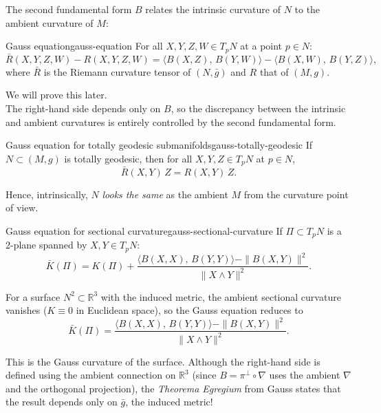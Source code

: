 The second fundamental form $B$ relates the intrinsic curvature of $N$ to the ambient curvature of $M$:

\begin{colortheo}{Gauss equation}{gauss-equation}
For all $X, Y, Z, W \in T_p N$ at a point $p \in N$:
\[
\bar R(X, Y, Z, W) - R(X, Y, Z, W) = \langle B(X, Z),\, B(Y, W)\rangle - \langle B(X, W),\, B(Y, Z)\rangle,
\]
where $\bar R$ is the Riemann curvature tensor of $(N, \bar g)$ and $R$ that of $(M, g)$.
\end{colortheo}

We will prove this later.\\

The right-hand side depends only on $B$, so the discrepancy between the intrinsic and ambient curvatures is entirely controlled by the second fundamental form.

\begin{colorcor}{Gauss equation for totally geodesic submanifolds}{gauss-totally-geodesic}
If $N \subset (M, g)$ is totally geodesic, then for all $X, Y, Z \in T_p N$ at $p \in N$,
\[
\bar R(X, Y)\, Z = R(X, Y)\, Z.
\]
\end{colorcor}

Hence, intrinsically, $N$ \emph{looks the same} as the ambient $M$ from the curvature point of view.

\begin{colorcor}{Gauss equation for sectional curvature}{gauss-sectional-curvature}
If $\Pi \subset T_p N$ is a 2-plane spanned by $X, Y \in T_p N$:
\[
\bar{K}(\Pi) = K(\Pi) + \frac{\langle B(X, X),\, B(Y, Y)\rangle - \|B(X, Y)\|^2}{\|X \wedge Y\|^2}.
\]
\end{colorcor}

\begin{colremark}
    \label{rem:theorema-egregium}
For a surface $N^2 \subset \mathbb{R}^3$ with the induced metric, the ambient sectional curvature vanishes ($K \equiv 0$ in Euclidean space), so the Gauss equation reduces to
\[
\bar{K}(\Pi) = \frac{\langle B(X, X),\, B(Y, Y)\rangle - \|B(X, Y)\|^2}{\|X \wedge Y\|^2}.
\]


This is the Gauss curvature of the surface. Although the right-hand side is defined using the ambient connection on $\mathbb{R}^3$ (since $B = \pi^\perp \circ \nabla$ uses the ambient $\nabla$ and the orthogonal projection), the \emph{Theorema Egregium} from Gauss states that the result depends only on $\bar g$, the induced metric!
\end{colremark}

